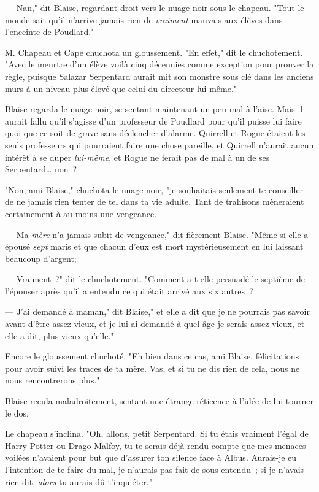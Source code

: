 --- Nan," dit Blaise, regardant droit vers le nuage noir sous le chapeau. "Tout le monde sait qu'il n'arrive jamais rien de \emph{vraiment} mauvais aux élèves dans l'enceinte de Poudlard."

M. Chapeau et Cape chuchota un gloussement. "En effet," dit le chuchotement. "Avec le meurtre d'un élève voilà cinq décennies comme exception pour prouver la règle, puisque Salazar Serpentard aurait mit son monstre sous clé dans les anciens murs à un niveau plus élevé que celui du directeur lui-même."

Blaise regarda le nuage noir, se sentant maintenant un peu mal à l'aise. Mais il aurait fallu qu'il s'agisse d'un professeur de Poudlard pour qu'il puisse lui faire quoi que ce soit de grave sans déclencher d'alarme. Quirrell et Rogue étaient les seuls professeurs qui pourraient faire une chose pareille, et Quirrell n'aurait aucun intérêt à se duper \emph{lui-même}, et Rogue ne ferait pas de mal à un de ses Serpentard… non~?

"Non, ami Blaise," chuchota le nuage noir, "je souhaitais seulement te conseiller de ne jamais rien tenter de tel dans ta vie adulte. Tant de trahisons mèneraient certainement à au moins une vengeance.

--- Ma \emph{mère} n'a jamais subit de vengeance," dit fièrement Blaise. "Même si elle a épousé \emph{sept} maris et que chacun d'eux est mort mystérieusement en lui laissant beaucoup d'argent;

--- Vraiment~?" dit le chuchotement. "Comment a-t-elle persuadé le septième de l'épouser après qu'il a entendu ce qui était arrivé aux six autres~?

--- J'ai demandé à maman," dit Blaise," et elle a dit que je ne pourrais pas savoir avant d'être assez vieux, et je lui ai demandé à quel âge je serais assez vieux, et elle a dit, plus vieux qu'elle."

Encore le gloussement chuchoté. "Eh bien dans ce cas, ami Blaise, félicitations pour avoir suivi les traces de ta mère. Vas, et si tu ne dis rien de cela, nous ne nous rencontrerons plus."

Blaise recula maladroitement, sentant une étrange réticence à l'idée de lui tourner le dos.

Le chapeau s'inclina. "Oh, allons, petit Serpentard. Si tu étais vraiment l'égal de Harry Potter ou Drago Malfoy, tu te serais déjà rendu compte que mes menaces voilées n'avaient pour but que d'assurer ton silence face à Albus. Aurais-je eu l'intention de te faire du mal, je n'aurais pas fait de sous-entendu~; si je n'avais rien dit, \emph{alors} tu aurais dû t'inquiéter."

